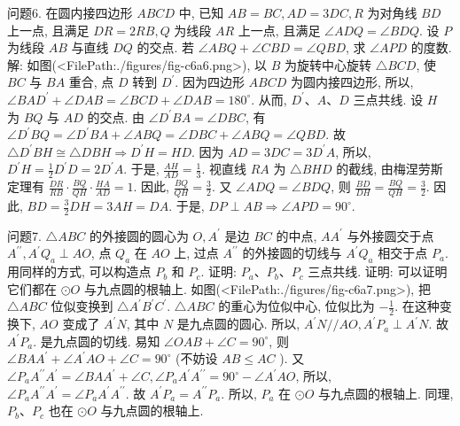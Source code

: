 问题6. 在圆内接四边形 $A B C D$ 中, 已知 $A B=B C, A D=3 D C, R$ 为对角线 $B D$ 上一点, 且满足 $D R=2 R B, Q$ 为线段 $A R$ 上一点, 且满足 $\angle A D Q= \angle B D Q$. 设 $P$ 为线段 $A B$ 与直线 $D Q$ 的交点.
若 $\angle A B Q+\angle C B D= \angle Q B D$, 求 $\angle A P D$ 的度数.
解: 如图(<FilePath:./figures/fig-c6a6.png>), 以 $B$ 为旋转中心旋转 $\triangle B C D$, 使
$B C$ 与 $B A$ 重合, 点 $D$ 转到 $D^{\prime}$.
因为四边形 $A B C D$ 为圆内接四边形, 所以, $\angle B A D^{\prime}+\angle D A B=\angle B C D+\angle D A B=180^{\circ}$. 从而, $D^{\prime} 、 A 、 D$ 三点共线.
设 $H$ 为 $B Q$ 与 $A D$ 的交点.
由 $\angle D^{\prime} B A=\angle D B C$, 有 $\angle D^{\prime} B Q=\angle D^{\prime} B A+ \angle A B Q=\angle D B C+\angle A B Q=\angle Q B D$. 故 $\triangle D^{\prime} B H \cong \triangle D B H \Rightarrow D^{\prime} H=H D$. 因为 $A D=3 D C=3 D^{\prime} A$, 所以, $D^{\prime} H=\frac{1}{2} D^{\prime} D=2 D^{\prime} A$. 于是, $\frac{A H}{A D}=\frac{1}{3}$. 视直线
$R A$ 为 $\triangle B H D$ 的截线, 由梅涅劳斯定理有 $\frac{D R}{R B} \cdot \frac{B Q}{Q H} \cdot \frac{H A}{A D}=1$. 因此, $\frac{B Q}{Q H}= \frac{3}{2}$. 又 $\angle A D Q=\angle B D Q$, 则 $\frac{B D}{D H}=\frac{B Q}{Q H}=\frac{3}{2}$. 因此, $B D=\frac{3}{2} D H=3 A H=D A$. 于是, $D P \perp A B \Rightarrow \angle A P D=90^{\circ}$.



问题7. $\triangle A B C$ 的外接圆的圆心为 $O, A^{\prime}$ 是边 $B C$ 的中点, $A A^{\prime}$ 与外接圆交于点 $A^{\prime \prime}, A^{\prime} Q_a \perp A O$, 点 $Q_a$ 在 $A O$ 上, 过点 $A^{\prime \prime}$ 的外接圆的切线与 $A^{\prime} Q_a$ 相交于点 $P_a$. 用同样的方式, 可以构造点 $P_b$ 和 $P_c$. 证明: $P_a 、 P_b 、 P_c$ 三点共线.
证明: 可以证明它们都在 $\odot O$ 与九点圆的根轴上.
如图(<FilePath:./figures/fig-c6a7.png>), 把 $\triangle A B C$ 位似变换到 $\triangle A^{\prime} B^{\prime} C^{\prime}$. $\triangle A B C$ 的重心为位似中心, 位似比为 $-\frac{1}{2}$. 在这种变换下, $A O$ 变成了 $A^{\prime} N$, 其中 $N$ 是九点圆的圆心.
所以, $A^{\prime} N / / A O, A^{\prime} P_a \perp A^{\prime} N$. 故 $A^{\prime} P_a$. 是九点圆的切线.
易知 $\angle O A B+\angle C=90^{\circ}$, 则 $\angle B A A^{\prime}+ \angle A^{\prime} A O+\angle C=90^{\circ}$ (不妨设 $A B \leqslant A C$ ). 又
$\angle P_a A^{\prime \prime} A^{\prime}=\angle B A A^{\prime}+\angle C, \angle P_a A^{\prime} A^{\prime \prime}=90^{\circ}- \angle A^{\prime} A O$, 所以, $\angle P_a A^{\prime \prime} A^{\prime}=\angle P_a A^{\prime} A^{\prime \prime}$. 故 $A^{\prime} P_a= A^{\prime \prime} P_a$. 所以, $P_a$ 在 $\odot O$ 与九点圆的根轴上.
同理, $P_b 、 P_c$ 也在 $\odot O$ 与九点圆的根轴上.



